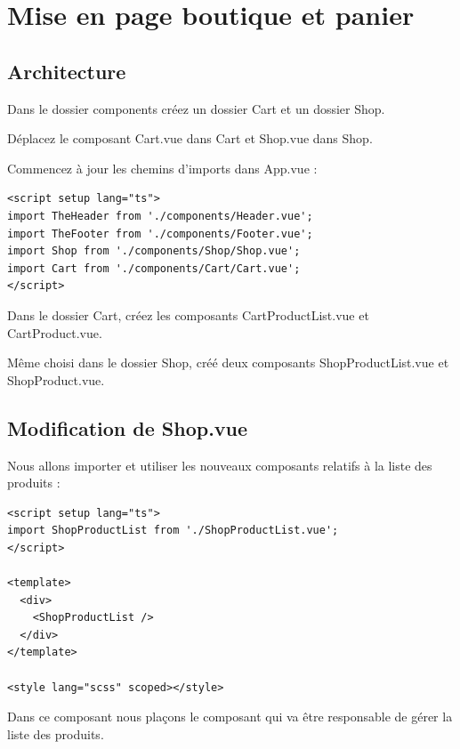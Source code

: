 \documentclass{article}
\begin{document}

\section{Mise en page boutique et panier}
\subsection{Architecture}
Dans le dossier components créez un dossier Cart et un dossier Shop.

Déplacez le composant Cart.vue dans Cart et Shop.vue dans Shop.

Commencez à jour les chemins d'imports dans App.vue :
\begin{verbatim}
<script setup lang="ts">
import TheHeader from './components/Header.vue';
import TheFooter from './components/Footer.vue';
import Shop from './components/Shop/Shop.vue';
import Cart from './components/Cart/Cart.vue';
</script>
\end{verbatim}

Dans le dossier Cart, créez les composants CartProductList.vue et CartProduct.vue.

Même choisi dans le dossier Shop, créé deux composants ShopProductList.vue et ShopProduct.vue.

\subsection{Modification de {\color{monOrange}Shop.vue}}
Nous allons importer et utiliser les nouveaux composants relatifs à la liste des produits :
\begin{verbatim}
<script setup lang="ts">
import ShopProductList from './ShopProductList.vue';
</script>

<template>
  <div>
    <ShopProductList />
  </div>
</template>

<style lang="scss" scoped></style>
\end{verbatim}
Dans ce composant nous plaçons le composant qui va être responsable de gérer la liste des produits.
\end{document}
